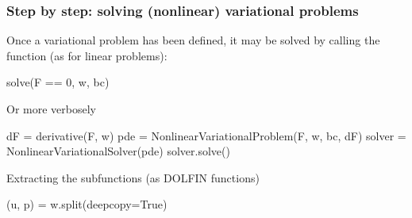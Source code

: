 \begin{frame}[fragile]
  \frametitle{Step by step: solving (nonlinear) variational problems}

  Once a variational problem has been defined, it may be solved
  by calling the  function (as for linear problems):
\vspace{-1em}
  \begin{python}
solve(F == 0, w, bc)
  \end{python}

Or more verbosely
\vspace{-1em}
  \begin{python}
dF = derivative(F, w)
pde = NonlinearVariationalProblem(F, w, bc, dF)
solver = NonlinearVariationalSolver(pde)
solver.solve()
  \end{python}

Extracting the subfunctions (as DOLFIN functions)
\vspace{-1em}
  \begin{python}
(u, p) = w.split(deepcopy=True)
  \end{python}



\end{frame}
